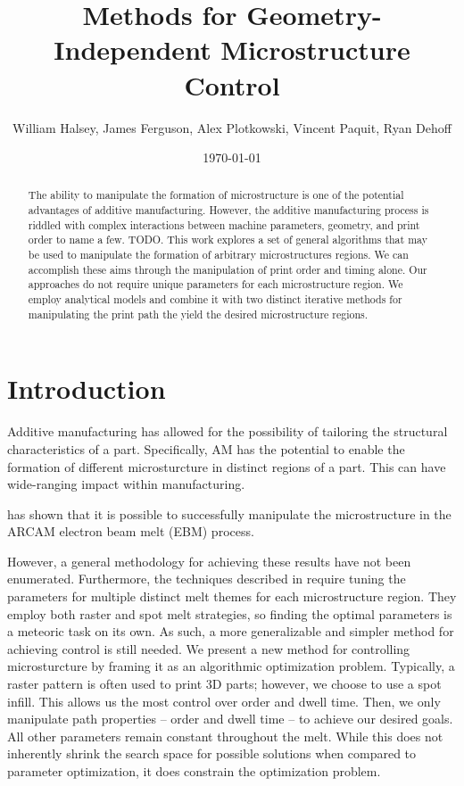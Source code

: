 \documentclass[a4paper]{article}
\title{Methods for Geometry-Independent Microstructure Control}
\author{William Halsey, James Ferguson, Alex Plotkowski, Vincent Paquit, Ryan Dehoff}
\date{\today}
\begin{document}
\maketitle

\begin{abstract}
The ability to manipulate the formation of microstructure is one of the potential advantages of additive manufacturing. However, the additive manufacturing process is riddled with complex interactions between machine parameters, geometry, and print order to name a few. TODO. This work explores a set of general algorithms that may be used to manipulate the formation of arbitrary microstructures regions. We can accomplish these aims through the manipulation of print order and timing alone. Our approaches do not require unique parameters for each microstructure region. We employ analytical models and combine it with two distinct iterative methods for manipulating the print path the yield the desired microstructure regions. 
\end{abstract}


\section{Introduction}
\label{sec:intro}

Additive manufacturing has allowed for the possibility of tailoring the structural characteristics of a part. Specifically, AM has the potential to enable the formation of different microsturcture in distinct regions of a part. This can have wide-ranging impact within manufacturing.

\cite{dehoff2015site} has shown that it is possible to successfully manipulate the microstructure in the ARCAM electron beam melt (EBM) process. 

However, a general methodology for achieving these results have not been enumerated. Furthermore, the techniques described in \cite{dehoff2015site} require tuning the parameters for multiple distinct melt themes for each microstructure region. They employ both raster and spot melt strategies, so finding the optimal parameters is a meteoric task on its own. As such, a more generalizable and simpler method for achieving control is still needed. We present a new method for controlling microsturcture by framing it as an algorithmic optimization problem. Typically, a raster pattern is often used to print 3D parts; however, we choose to use a spot infill. This allows us the most control over order and dwell time. Then, we only manipulate path properties – order and dwell time – to achieve our desired goals. All other parameters remain constant throughout the melt. While this does not inherently shrink the search space for possible solutions when compared to parameter optimization, it does constrain the optimization problem. 
\end{document}

